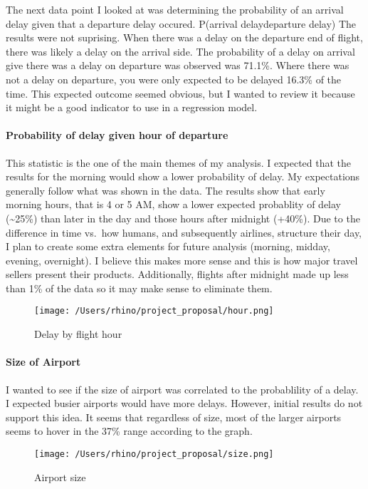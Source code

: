 \documentclass[]{article}
\let\oldparagraph\paragraph
\renewcommand{\paragraph}[1]{\oldparagraph{#1}\mbox{}}
\begin{document}
The next data point I looked at was determining the probability of an
arrival delay given that a departure delay occured. P(arrival
delay\textbar{}departure delay) The results were not suprising. When
there was a delay on the departure end of flight, there was likely a
delay on the arrival side. The probability of a delay on arrival give
there was a delay on departure was observed was 71.1\%. Where there was
not a delay on departure, you were only expected to be delayed 16.3\% of
the time. This expected outcome seemed obvious, but I wanted to review
it because it might be a good indicator to use in a regression model.

\paragraph{Probability of delay given hour of
departure}\label{probability-of-delay-given-hour-of-departure}

This statistic is the one of the main themes of my analysis. I expected
that the results for the morning would show a lower probability of
delay. My expectations generally follow what was shown in the data. The
results show that early morning hours, that is 4 or 5 AM, show a lower
expected probablity of delay (\textasciitilde{}25\%) than later in the
day and those hours after midnight (+40\%). Due to the difference in
time vs.~how humans, and subsequently airlines, structure their day, I
plan to create some extra elements for future analysis (morning, midday,
evening, overnight). I believe this makes more sense and this is how
major travel sellers present their products. Additionally, flights after
midnight made up less than 1\% of the data so it may make sense to
eliminate them.

\begin{figure}
\centering
\texttt{[image: /Users/rhino/project\_proposal/hour.png]}
\caption{Delay by flight hour}
\end{figure}

\paragraph{Size of Airport}\label{size-of-airport}

I wanted to see if the size of airport was correlated to the
probablility of a delay. I expected busier airports would have more
delays. However, initial results do not support this idea. It seems that
regardless of size, most of the larger airports seems to hover in the
37\% range according to the graph.

\begin{figure}
\centering
\texttt{[image: /Users/rhino/project\_proposal/size.png]}
\caption{Airport size}
\end{figure}
\end{document}
